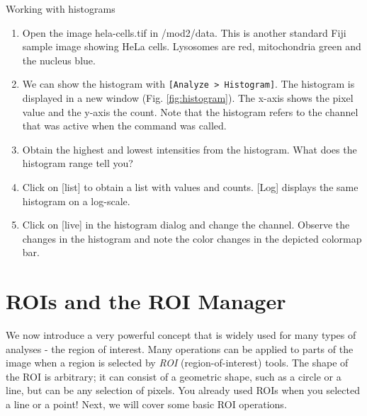 \begin{taskbox}{Working with histograms}
\begin{enumerate}
	\item Open the image hela-cells.tif in /mod2/data. This is another standard Fiji sample image showing HeLa cells. Lysosomes are red, mitochondria green and the nucleus blue. 
	\item We can show the histogram with \texttt{[Analyze > Histogram]}. The histogram is displayed in a new window (Fig. \ref{fig:histogram}). The x-axis shows the pixel value and the y-axis the count. Note that the histogram refers to the channel that was active when the command was called.
	
	\begin{minipage}[t]{\linewidth}
		\begin{center}
		\medskip
		\label{fig:histogram}
		\end{center}
	\end{minipage}
	
	\item Obtain the highest and lowest intensities from the histogram. What does the histogram range tell you?
	\item Click on [list] to obtain a list with values and counts. [Log] displays the same histogram on a log-scale.
	\item Click on [live] in the histogram dialog and change the channel. Observe the changes in the histogram and note the color changes in the depicted colormap bar.
	
\end{enumerate}

\end{taskbox}

\section{ROIs and the ROI Manager}
We now introduce a very powerful concept that is widely used for many types of analyses - the region of interest. Many operations can be applied to parts of the image when a region is selected by \emph{ROI} (region-of-interest) tools. The shape of the ROI is arbitrary; it can consist of a geometric shape, such as a circle or a line, but can be any selection of pixels. You already used ROIs when you selected a line or a point! Next, we will cover some basic ROI operations.

